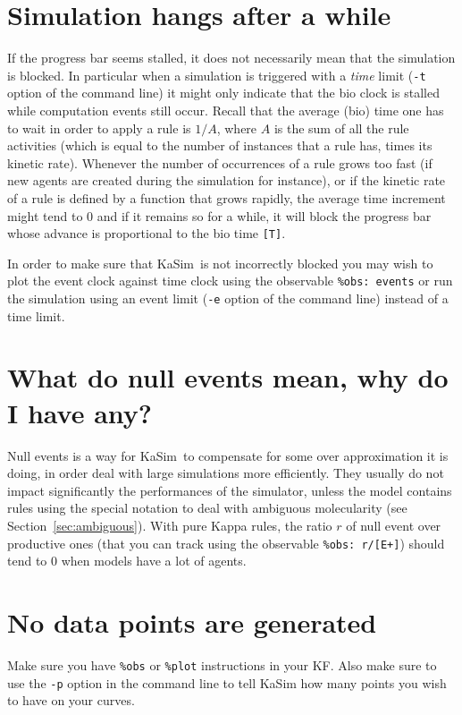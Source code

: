 \documentclass[11pt]{book}
\def\KaSim{\textsf{KaSim}}
\def\ttt#1{\texttt{#1}}
\begin{document}
\section*{Simulation hangs after a while}
If the progress bar seems stalled, it does not necessarily mean that the simulation is blocked. In particular when a simulation is triggered with a \emph{time} limit (\ttt{-t} option of the command line) it might only indicate that the bio clock is stalled while computation events still occur. Recall that the average (bio) time one has to wait in order to apply a rule is $1/A$, where $A$ is the sum of all the rule activities (which is equal to the number of instances that a rule has, times its kinetic rate). Whenever the number of occurrences of a rule grows too fast (if new agents are created during the simulation for instance), or if the kinetic rate of a rule is defined by a function that grows rapidly, the average time increment might tend to 0 and if it remains so for a while, it will block the progress bar whose advance is proportional to the bio time \ttt{[T]}. 

In order to make sure that \KaSim~is not incorrectly blocked you may wish to plot the event clock against time clock using the observable \ttt{\%obs: \textquotesingle events\textquotesingle  [E]} or run the simulation using an event limit (\ttt{-e} option of the command line) instead of a time limit.

\section*{What do null events mean, why do I have any?}

Null events is a way for \KaSim~to compensate for some over approximation it is doing, in order deal with large simulations more efficiently. They usually do not impact significantly the performances of the simulator, unless the model contains rules using the special notation to deal with ambiguous molecularity (see Section~\ref{sec:ambiguous}). With pure Kappa rules, the ratio $r$ of null event over productive ones (that you can track using the observable \ttt{\%obs: \textquotesingle r\textquotesingle   [E-]/[E+]}) should tend to 0 when models have a lot of agents.

\section*{No data points are generated}
Make sure you have \ttt{\%obs} or \ttt{\%plot} instructions in your KF. Also make sure to use the \ttt{-p} option in the command line to tell KaSim how many points you wish to have on your curves. 
\end{document}
